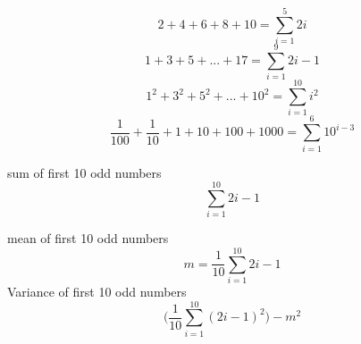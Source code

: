 $$ 2 + 4 + 6 +8 + 10 = \sum_{i=1}^{5}2i$$
$$ 1 + 3 + 5 + ... + 17  = \sum_{i=1}^{9}2i-1$$
$$ 1^2 + 3^2 + 5^2 + ... + 10^2  = \sum_{i=1}^{10}i^2$$
$$ \frac{1}{100} + \frac{1}{10} + 1 + 10 + 100 + 1000  = \sum_{i=1}^{6}10^{i-3}$$


sum of first 10 odd numbers $$\sum_{i=1}^{10}2i-1$$

mean of first 10 odd numbers $$ m = \frac{1}{10}\sum_{i=1}^{10}2i-1$$
Variance of first 10 odd numbers $$\Big(\frac{1}{10}\sum_{i=1}^{10}(2i-1)^2\Big) - m^2$$
